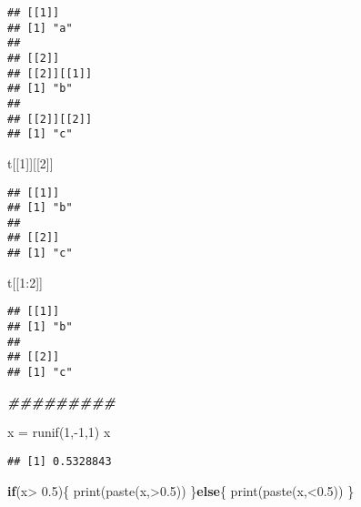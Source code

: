 \documentclass[]{article}
\newenvironment{Shaded}{\begin{snugshade}}{\end{snugshade}}
\newcommand{\ControlFlowTok}[1]{\textcolor[rgb]{0.13,0.29,0.53}{\textbf{#1}}}
\newcommand{\DecValTok}[1]{\textcolor[rgb]{0.00,0.00,0.81}{#1}}
\newcommand{\DocumentationTok}[1]{\textcolor[rgb]{0.56,0.35,0.01}{\textbf{\textit{#1}}}}
\newcommand{\FloatTok}[1]{\textcolor[rgb]{0.00,0.00,0.81}{#1}}
\newcommand{\FunctionTok}[1]{\textcolor[rgb]{0.00,0.00,0.00}{#1}}
\newcommand{\NormalTok}[1]{#1}
\newcommand{\OtherTok}[1]{\textcolor[rgb]{0.56,0.35,0.01}{#1}}
\newcommand{\SpecialCharTok}[1]{\textcolor[rgb]{0.00,0.00,0.00}{#1}}
\newcommand{\StringTok}[1]{\textcolor[rgb]{0.31,0.60,0.02}{#1}}
\begin{document}
\begin{verbatim}
## [[1]]
## [1] "a"
## 
## [[2]]
## [[2]][[1]]
## [1] "b"
## 
## [[2]][[2]]
## [1] "c"
\end{verbatim}

\begin{Shaded}
\begin{Highlighting}[]
\NormalTok{t[[}\DecValTok{1}\NormalTok{]][[}\DecValTok{2}\NormalTok{]]}
\end{Highlighting}
\end{Shaded}

\begin{verbatim}
## [[1]]
## [1] "b"
## 
## [[2]]
## [1] "c"
\end{verbatim}

\begin{Shaded}
\begin{Highlighting}[]
\NormalTok{t[[}\DecValTok{1}\SpecialCharTok{:}\DecValTok{2}\NormalTok{]]}
\end{Highlighting}
\end{Shaded}

\begin{verbatim}
## [[1]]
## [1] "b"
## 
## [[2]]
## [1] "c"
\end{verbatim}

\begin{Shaded}
\begin{Highlighting}[]
\DocumentationTok{\#\#\#\#\#\#\#\#\#}

\NormalTok{x }\OtherTok{=} \FunctionTok{runif}\NormalTok{(}\DecValTok{1}\NormalTok{,}\SpecialCharTok{{-}}\DecValTok{1}\NormalTok{,}\DecValTok{1}\NormalTok{)}
\NormalTok{x}
\end{Highlighting}
\end{Shaded}

\begin{verbatim}
## [1] 0.5328843
\end{verbatim}

\begin{Shaded}
\begin{Highlighting}[]
\ControlFlowTok{if}\NormalTok{(x}\SpecialCharTok{\textgreater{}} \FloatTok{0.5}\NormalTok{)\{}
  \FunctionTok{print}\NormalTok{(}\FunctionTok{paste}\NormalTok{(x,}\StringTok{\textquotesingle{}\textgreater{}0.5\textquotesingle{}}\NormalTok{))}
\NormalTok{\}}\ControlFlowTok{else}\NormalTok{\{}
  \FunctionTok{print}\NormalTok{(}\FunctionTok{paste}\NormalTok{(x,}\StringTok{\textquotesingle{}\textless{}0.5\textquotesingle{}}\NormalTok{))}
\NormalTok{\}}
\end{Highlighting}
\end{Shaded}
\end{document}
